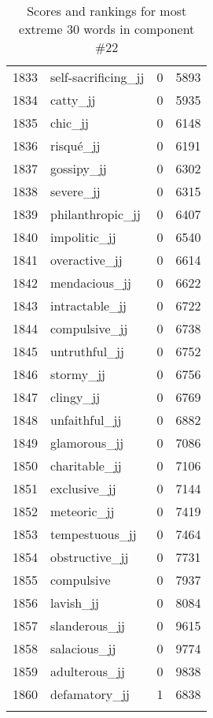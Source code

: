 \begin{longtable}[!htbp]{| rlr@{.}l |}
    1833 & self-sacrificing\_jj & 0 & 5893 \\
    1834 & catty\_jj & 0 & 5935 \\
    1835 & chic\_jj & 0 & 6148 \\
    1836 & risqué\_jj & 0 & 6191 \\
    1837 & gossipy\_jj & 0 & 6302 \\
    1838 & severe\_jj & 0 & 6315 \\
    1839 & philanthropic\_jj & 0 & 6407 \\
    1840 & impolitic\_jj & 0 & 6540 \\
    1841 & overactive\_jj & 0 & 6614 \\
    1842 & mendacious\_jj & 0 & 6622 \\
    1843 & intractable\_jj & 0 & 6722 \\
    1844 & compulsive\_jj & 0 & 6738 \\
    1845 & untruthful\_jj & 0 & 6752 \\
    1846 & stormy\_jj & 0 & 6756 \\
    1847 & clingy\_jj & 0 & 6769 \\
    1848 & unfaithful\_jj & 0 & 6882 \\
    1849 & glamorous\_jj & 0 & 7086 \\
    1850 & charitable\_jj & 0 & 7106 \\
    1851 & exclusive\_jj & 0 & 7144 \\
    1852 & meteoric\_jj & 0 & 7419 \\
    1853 & tempestuous\_jj & 0 & 7464 \\
    1854 & obstructive\_jj & 0 & 7731 \\
    1855 & compulsive & 0 & 7937 \\
    1856 & lavish\_jj & 0 & 8084 \\
    1857 & slanderous\_jj & 0 & 9615 \\
    1858 & salacious\_jj & 0 & 9774 \\
    1859 & adulterous\_jj & 0 & 9838 \\
    1860 & defamatory\_jj & 1 & 6838 \\
    \hline
    \caption{Scores and rankings for most extreme 30 words in component \#22} \\
\end{longtable}
